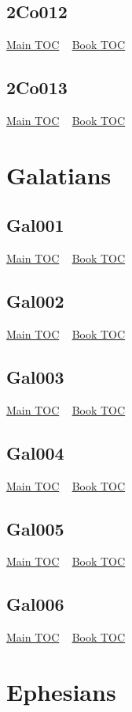 \documentclass{book}
\begin{document}
  \section{2Co012}\hyperlink{toc}{Main TOC} ~ \hyperref[subsec:2Co]{Book TOC} 
  \section{2Co013}\hyperlink{toc}{Main TOC} ~ \hyperref[subsec:2Co]{Book TOC} 
  \chapter{Galatians} \label{subsec:Gal} \begin{multicols}{2} \minitoc \end{multicols}
  \section{Gal001}\hyperlink{toc}{Main TOC} ~ \hyperref[subsec:Gal]{Book TOC} 
  \section{Gal002}\hyperlink{toc}{Main TOC} ~ \hyperref[subsec:Gal]{Book TOC} 
  \section{Gal003}\hyperlink{toc}{Main TOC} ~ \hyperref[subsec:Gal]{Book TOC} 
  \section{Gal004}\hyperlink{toc}{Main TOC} ~ \hyperref[subsec:Gal]{Book TOC} 
  \section{Gal005}\hyperlink{toc}{Main TOC} ~ \hyperref[subsec:Gal]{Book TOC} 
  \section{Gal006}\hyperlink{toc}{Main TOC} ~ \hyperref[subsec:Gal]{Book TOC} 
  \chapter{Ephesians} \label{subsec:Eph} \begin{multicols}{2} \minitoc \end{multicols}
\end{document}
